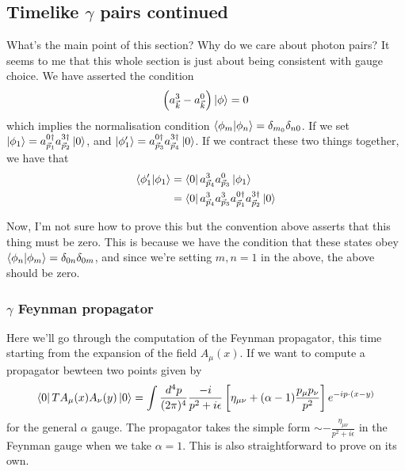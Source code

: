 \subsection{Timelike $ \gamma $ pairs continued}
What's the main point of this section?
Why do we care about photon pairs? 
It seems to me that this whole section is just about being consistent 
with gauge choice. 
We have asserted the condition 
\[
 \left( a _{ \vec{k} } ^ 3 - a_{\vec{k} } ^ 0  \right)  \ket{ \phi }  = 0
\] which implies the normalisation 
condition $ \bra{ \phi _ m }\ket{ \phi _ n }  = \delta _{ m_0 } \delta _{ n 0 }$. 
If we set $ \ket{ \phi _ 1 }  = a _{ \vec{p} _ 1 }^{ 0 \dagger } a _{ \vec{p} _ 2 } ^{ 3 \dagger } 
\ket{ 0 } $, and $ \ket{ \phi _ 1 ' }  = a_{ \vec{p} _ 3 } ^{ 0 \dagger } a_{ \vec{p} _ 4 } ^{ 
3 \dagger}  \ket{ 0 }  $. 
If we contract these two things 
together, we have that 
\begin{align*}
\bra{ \phi _ 1 ' }\ket{ \phi _ 1 } &=  \bra{ 0 }a _{ \vec{p}_ 4 } ^{ 3 } a _{ \vec{p} _ 3 } ^ 0 \ket{ \phi _ 1 }  \\
				   &=  \bra{ 0 }a_{\vec{p} _ 4 } ^{ 3 } a _{ \vec{p} _ 3 } ^ 3 a_{ \vec{p}_ 1 }^{ 0 \dagger } a_{\vec{p}_ 2 } ^{ 3 \dagger } \ket{0 }   
\end{align*}

Now, I'm not sure how to prove this 
but the convention above asserts that this thing must be zero. 
This is because we have the condition that these states 
obey $ \bra{ \phi _ n }\ket{ \phi _ m }  = \delta _{ 0n } \delta_{ 0m }$, 
and since we're setting $ m, n   =1 $ in the above, the above should 
be zero. 

\subsubsection{$ \gamma $ Feynman propagator}
Here we'll go through the computation of 
the Feynman propagator, this time starting from 
the expansion of the field $ A _ \mu ( x) $. 
If we want to compute a propagator bewteen two points 
given by 
\[
	\bra{ 0 }T  A_ \mu ( x ) A _ \nu ( y ) \ket{ 0 }  = 
	\int \frac{d ^  4 p }{ ( 2 \pi )^{ 4 }  } \frac{ -  i }{ p ^ 2 + i \epsilon} 
	\left[  \eta _{ \mu \nu } + ( \alpha - 1 ) \frac{p _ \mu p _ \nu }{ p ^ 2  } \right]  
	e ^{ - i p \cdot  ( x - y ) }
\] for the general $ \alpha $ gauge. 
The propagator takes the simple form $ \sim  - \frac{\eta _{ \mu \nu } }{ p ^ 2 + i \epsilon } $ 
in the Feynman gauge when we take $ \alpha = 1 $. This is also straightforward to prove on its 
own. 

